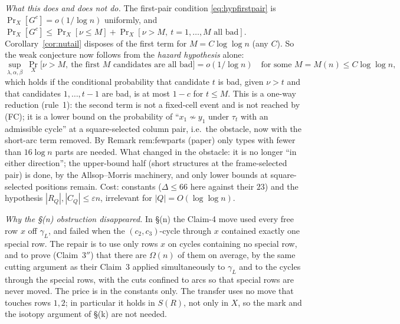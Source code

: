 \emph{What this does and does not do.}  The first-pair condition
\eqref{eq:hypfirstpair} is $\Pr_X[G^c]=o(1/\log n)$ uniformly, and
$\Pr_X[G^c]\le\Pr_X[\nu\le M]+\Pr_X[\nu>M,\ t=1,\dots,M\text{ all bad}]$.
Corollary~\ref{cor:nutail} disposes of the first term for
$M=C\log\log n$ (any $C$).  So the weak conjecture now follows from the
\emph{hazard hypothesis} alone:
\begin{equation}\label{eq:hyphazard}
\sup_{\lambda,\alpha,\beta}\ \Pr_X\bigl[\nu>M,\ \text{the first $M$ candidates are all bad}\bigr]=o(1/\log n)
\quad\text{for some }M=M(n)\le C\log\log n,
\end{equation}
which holds if the conditional probability that candidate $t$ is bad,
given $\nu>t$ and that candidates $1,\dots,t-1$ are bad, is at most
$1-c$ for $t\le M$.  This is a one-way reduction (rule~1): the second
term is not a fixed-cell event and is not reached by (FC); it is a
lower bound on the probability of ``$x_1\not\sim y_1$ under $\tau_t$
with an admissible cycle'' at a square-selected column pair, i.e.\ the
obstacle, now with the short-arc term removed.  By Remark rem:fewparts
(paper) only types with fewer than $16\log n$ parts are needed.  What
changed in the obstacle: it is no longer ``in either direction''; the
upper-bound half (short structures at the frame-selected pair) is
done, by the Allsop--Morris machinery, and only lower bounds at
square-selected positions remain.  Cost: constants ($\Delta\le66$ here
against their $23$) and the hypothesis $|R_Q|,|C_Q|\le\varepsilon n$,
irrelevant for $|Q|=O(\log\log n)$.

\emph{Why the \S(n) obstruction disappeared.}  In \S(n) the Claim-4
move used every free row $x$ off $\gamma_L$, and failed when the
$(c_2,c_3)$-cycle through $x$ contained exactly one special row.  The
repair is to use only rows $x$ on cycles containing no special row,
and to prove (Claim~$3''$) that there are $\Omega(n)$ of them on
average, by the same cutting argument as their Claim~3 applied
simultaneously to $\gamma_L$ and to the cycles through the special
rows, with the cuts confined to arcs so that special rows are never
moved.  The price is in the constants only.  The transfer uses no move
that touches rows $1,2$; in particular it holds in $S(R)$, not only in
$X$, so the mark and the isotopy argument of \S(k) are not needed.


